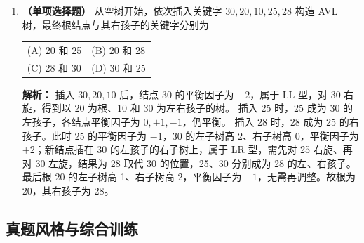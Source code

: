 \begin{enumerate}
\ifshowsolutions\par\noindent\textbf{解析：} 每次取两个最小权值合并：
$3+6=9$，森林变为 $\{8,9,12,15\}$；
$8+9=17$，森林变为 $\{12,15,17\}$；
$12+15=27$，森林变为 $\{17,27\}$；
$17+27=44$，构造结束。
WPL 等于所有内部结点权值之和，即
\[
\mathrm{WPL}=9+17+27+44=97.
\]
逐个叶子核对：$3,6$ 的路径长为 3，$8$ 为 2，$12,15$ 为 2，于是 $3\times3+6\times3+8\times2+12\times2+15\times2=9+18+16+24+30=97$，一致。
\else \answerarea \fi

\item \textbf{（单项选择题）} 从空树开始，依次插入关键字 $30,20,10,25,28$ 构造 AVL 树，最终根结点与其右孩子的关键字分别为
\begin{center}
\begin{tabular}{ll}
(A) 20 和 25 & (B) 20 和 28 \\[4pt]
(C) 28 和 30 & (D) 30 和 25
\end{tabular}
\end{center}

\ifshowsolutions\par\noindent\textbf{解析：} 插入 $30,20,10$ 后，结点 30 的平衡因子为 $+2$，属于 LL 型，对 30 右旋，得到以 20 为根、10 和 30 为左右孩子的树。
插入 25 时，25 成为 30 的左孩子，各结点平衡因子为 $0,+1,-1$，仍平衡。
插入 28 时，28 成为 25 的右孩子。此时 25 的平衡因子为 $-1$，30 的左子树高 2、右子树高 0，平衡因子为 $+2$；新结点插在 30 的左孩子的右子树上，属于 LR 型，需先对 25 右旋、再对 30 左旋，结果为 28 取代 30 的位置，25、30 分别成为 28 的左、右孩子。
最后根 20 的左子树高 1、右子树高 2，平衡因子为 $-1$，无需再调整。故根为 20，其右孩子为 28。
\else \answerarea \fi

\end{enumerate}

\subsection{真题风格与综合训练}

